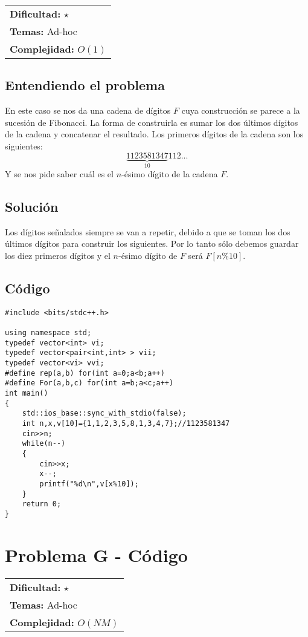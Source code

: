 \hfill
\begin{tabular}{@{}l@{}}
\textbf{Dificultad:} $\star$ \\
\textbf{Temas:} Ad-hoc \\
\textbf{Complejidad:} $O(1)$
\end{tabular}

\subsection*{Entendiendo el problema}
En este caso se nos da una cadena de dígitos $F$ cuya construcción se parece a la sucesión de Fibonacci. La forma de construirla es sumar los dos últimos dígitos de la cadena y concatenar el resultado. Los primeros dígitos de la cadena son los siguientes:
\[
\underbrace{1123581347}_{10}112...
\]
Y se nos pide saber cuál es el $n$-ésimo dígito de la cadena $F$.
\subsection*{Solución}
Los dígitos señalados siempre se van a repetir, debido a que se toman los dos últimos dígitos para construir los siguientes. Por lo tanto sólo debemos guardar los diez primeros dígitos y el $n$-ésimo dígito de $F$ será $F[n\%10]$.
\subsection*{Código}

\begin{verbatim}
#include <bits/stdc++.h>

using namespace std;
typedef vector<int> vi;
typedef vector<pair<int,int> > vii;
typedef vector<vi> vvi;
#define rep(a,b) for(int a=0;a<b;a++)
#define For(a,b,c) for(int a=b;a<c;a++)
int main()
{
    std::ios_base::sync_with_stdio(false);
    int n,x,v[10]={1,1,2,3,5,8,1,3,4,7};//1123581347
    cin>>n;
    while(n--)
    {
        cin>>x;
        x--;
        printf("%d\n",v[x%10]);
    }
    return 0;
}
\end{verbatim}

\section{Problema G - Código}

\hfill
\begin{tabular}{@{}l@{}}
\textbf{Dificultad:} $\star$ \\
\textbf{Temas:} Ad-hoc \\
\textbf{Complejidad:} $O(NM)$
\end{tabular}

